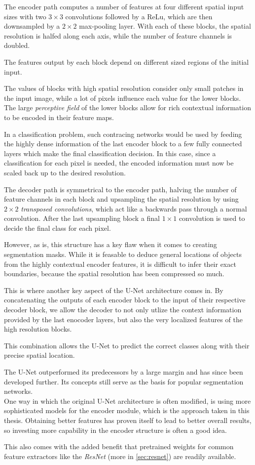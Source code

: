 The encoder path computes a number of features at four different spatial input sizes with two $3\times 3$ convolutions followed by a ReLu, which are then downsampled by a $2\times 2$ max-pooling layer. 
With each of these blocks, the spatial resolution is halfed along each axis, while the number of feature channels is doubled.

The features output by each block depend on different sized regions of the initial input. 

The values of blocks with high spatial resolution consider only small patches in the input image, while a lot of pixels influence each value for the lower blocks. 
The large \emph{perceptive field} of the lower blocks allow for rich contextual information to be encoded in their feature maps.

In a classification problem, such contracing networks would be used by feeding the highly dense information of the last encoder block to a few fully connected layers which make the final classification decision. 
In this case, since a classification for each pixel is needed, the encoded information must now be scaled back up to the desired resolution.

The decoder path is symmetrical to the encoder path, halving the number of feature channels in each block and upsampling the spatial resolution by using $2\times 2$ \emph{transposed convolutions}, which act like a backwards pass through a normal convolution.
After the last upsampling block a final $1\times 1$ convolution is used to decide the final class for each pixel.

However, as is, this structure has a key flaw when it comes to creating segmentation masks. While it is feasable to deduce general locations of objects from the highly contextual encoder features, it is difficult to infer their exact boundaries, because the spatial resolution has been compressed so much. 

This is where another key aspect of the U-Net architecture comes in. 
By concatenating the outputs of each encoder block to the input of their respective decoder block, we allow the decoder to not only utlize the context information provided by the last enocoder layers, but also the very localized features of the high resolution blocks.

This combination allows the U-Net to predict the correct classes along with their precise spatial location.

The U-Net outperformed its predecessors by a large margin and has since been developed further. Its concepts still serve as the basis for popular segmentation networks.\\

One way in which the original U-Net architecture is often modified, is using more sophisticated models for the encoder module, which is the approach taken in this thesis. 
Obtaining better features has proven itself to lead to better overall results, so investing more capability in the encoder structure is often a good idea. 

This also comes with the added benefit that pretrained weights for common feature extractors like the \emph{ResNet} (more in \ref{sec:resnet}) are readily available. 
